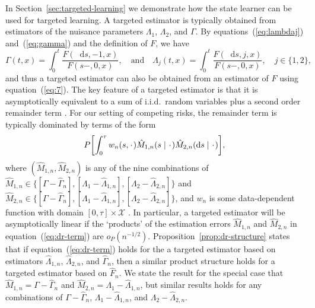 \documentclass{statsoc}
\newcommand{\blank}{\makebox[1ex]{\textbf{$\cdot$}}}
\newcommand*\diff{\mathop{}\!\mathrm{d}}
\newcommand\smallO{\textit{o}}
\newcommand{\1}{\mathds{1}}
\begin{document}
In Section~\ref{sec:targeted-learning} we demonstrate how the state learner can
be used for targeted learning. A targeted estimator is typically obtained from
estimators of the nuisance parameters $\Lambda_1$, $\Lambda_2$, and $\Gamma$. By
equations~(\ref{eq:lambdaj}) and~(\ref{eq:gamma}) and the definition of \( F \),
we have
\begin{equation}
  \label{eq:7}
  \Gamma(t , x) 
  = \int_0^t  \frac{F(\diff s, -1, x )}{F(s-, 0, x )},
  \quad \text{and} \quad
  \Lambda_j(t , x) 
  = \int_0^t  \frac{F(\diff s, j, x )}{F(s-, 0, x )},
  \quad j \in \{1,2\},
\end{equation}
and thus a targeted estimator can also be obtained from an estimator of $F$
using equation~(\ref{eq:7}). The key feature of a targeted estimator is that it
is asymptotically equivalent to a sum of i.i.d.\ random variables plus a second
order remainder term \citep{bickel1993efficient,fisher2021visually}. For our
setting of competing risks, the remainder term is typically dominated by terms
of the form
\begin{equation}
  \label{eq:dr-term}
  P{\left[
      \int_0^{\tau} w_n(s, \blank)
      \hat{M}_{1,n}(s \mid  \blank)
      \hat{M}_{2,n}(\diff s \mid  \blank)
    \right]},
\end{equation}
where \( (\hat{M}_{1,n}, \hat{M}_{2,n}) \) is any of the nine combinations of
\( \hat{M}_{1,n} \in \{[\Gamma -\hat{\Gamma}_n], [\Lambda_1
-\hat{\Lambda}_{1,n}], [\Lambda_2 -\hat{\Lambda}_{2,n}]\} \) and
\( \hat{M}_{2,n} \in \{[\Gamma -\hat{\Gamma}_n], [\Lambda_1
-\hat{\Lambda}_{1,n}], [\Lambda_2 -\hat{\Lambda}_{2,n}]\} \), and \( w_n \) is
some data-dependent function with domain \([0,\tau]\times\mathcal X \)
\citep{van2003unified}. In particular, a targeted estimator will be
asymptotically linear if the `products' of the estimation errors
\( \hat{M}_{1,n} \) and \( \hat{M}_{2,n} \) in equation~(\ref{eq:dr-term}) are
\( \smallO_P{(n^{-1/2})}\). Proposition~\ref{prop:dr-structure} states that if
equation~(\ref{eq:dr-term}) holds for the a targeted estimator based on
estimators $\hat{\Lambda}_{1,n}$, $\hat{\Lambda}_{2,n}$, and $\hat{\Gamma}_{n}$,
then a similar product structure holds for a targeted estimator based on
\( \hat{F}_n \). We state the result for the special case that
\(\hat{M}_{1,n}= \Gamma-\hat{\Gamma}_n \) and
\(\hat{M}_{2,n} =\Lambda_1-\hat{\Lambda}_{1,n} \), but similar results holds for
any combinations of \( \Gamma-\hat{\Gamma}_n\),
\( \Lambda_1-\hat{\Lambda}_{1,n} \), and \( \Lambda_2-\hat{\Lambda}_{2,n} \).
\end{document}
